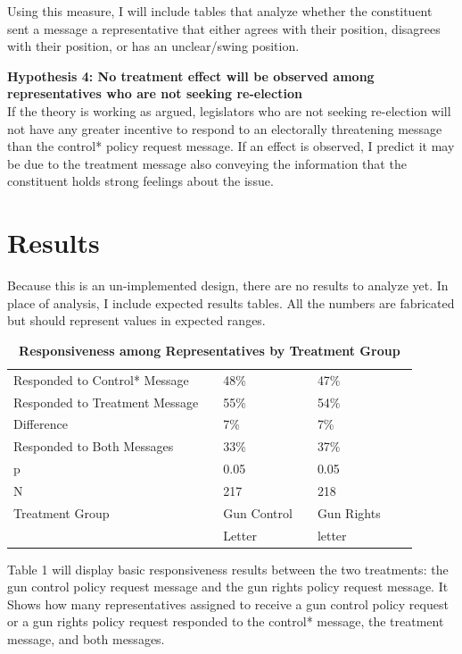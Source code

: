 \documentclass[12pt]{article}\usepackage[]{graphicx}\usepackage[]{color}
\begin{document}
Using this measure, I will include tables that analyze whether the constituent sent a message a representative that either agrees with their position, disagrees with their position, or has an unclear/swing position.


\textbf{Hypothesis 4: No treatment effect will be observed among representatives who are not seeking re-election}\\
If the theory is working as argued, legislators who are not seeking re-election will not have any greater incentive to respond to an electorally threatening message than the control* policy request message. If an effect is observed, I predict it may be due to the treatment message also conveying the information that the constituent holds strong feelings about the issue.

\section{Results}
Because this is an un-implemented design, there are no results to analyze yet. In place of analysis, I include expected results tables. All the numbers are fabricated but should represent values in expected ranges.
 \begin{table}[h!]
	\caption{\textbf{Responsiveness among Representatives by Treatment Group}}
	\label{tab2}
	\begin{tabular}{lllllll}
		Responded to Control* Message   && 48\%            &&   47\%\\
		Responded to Treatment Message && 55\%          &&   54\%\\ 
		Difference && 7\%            &&   7\%\\ 
		Responded to Both Messages && 33\% &&   37\%\\
		\hline
		p            && 0.05 				&&   0.05 \\
		N 			 &&      217 			 &&  218    \\
		\hline
		Treatment Group && Gun Control  && Gun Rights & \\
						&&	Letter		&& letter
	\end{tabular}
\end{table}

Table 1 will display basic responsiveness results between the two treatments: the gun control policy request message and the gun rights policy request message. It Shows how many representatives assigned to receive a gun control policy request or a gun rights policy request responded to the control* message, the treatment message, and both messages.
\end{document}
